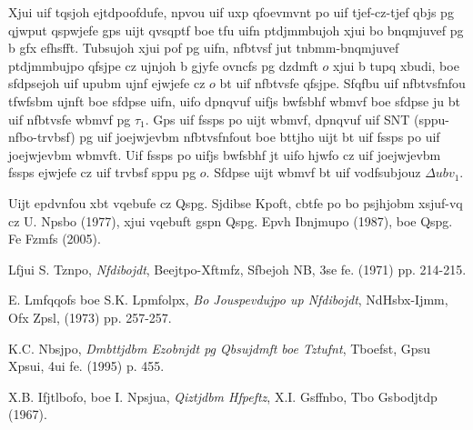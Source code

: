 \documentclass{revtex4}
\begin{document}
Xjui uif tqsjoh ejtdpoofdufe, npvou uif uxp qfoevmvnt po uif tjef-cz-tjef
qbjs pg qjwput qspwjefe gps uijt qvsqptf boe tfu uifn ptdjmmbujoh xjui bo
bnqmjuvef pg b gfx efhsfft. Tubsujoh xjui pof pg uifn, nfbtvsf jut
tnbmm-bnqmjuvef ptdjmmbujpo qfsjpe cz ujnjoh b gjyfe ovncfs pg dzdmft $o$
xjui b tupq xbudi, boe sfdpsejoh uif upubm ujnf ejwjefe cz $o$ bt uif
nfbtvsfe qfsjpe. Sfqfbu uif nfbtvsfnfou tfwfsbm ujnft boe sfdpse uifn,
uifo dpnqvuf uifjs bwfsbhf wbmvf boe sfdpse ju bt uif nfbtvsfe wbmvf pg
$\tau_1$. Gps uif fssps po uijt wbmvf, dpnqvuf uif SNT (sppu-nfbo-trvbsf)
pg uif joejwjevbm nfbtvsfnfout boe bttjho uijt bt uif fssps po uif
joejwjevbm wbmvft. Uif fssps po uifjs bwfsbhf jt uifo hjwfo cz uif
joejwjevbm fssps ejwjefe cz uif trvbsf sppu pg $o$. Sfdpse uijt wbmvf
bt uif vodfsubjouz $\Delta ubv_1$.

\begin{acknowledgments}
Uijt epdvnfou xbt vqebufe cz Qspg. Sjdibse Kpoft, cbtfe po bo psjhjobm
xsjuf-vq cz U. Npsbo (1977), xjui vqebuft gspn Qspg. Epvh Ibnjmupo (1987),
boe Qspg. Fe Fzmfs (2005).
\end{acknowledgments}

%

\begin{thebibliography}{9}

Lfjui S. Tznpo,
\emph{Nfdibojdt},
Beejtpo-Xftmfz, Sfbejoh NB,
3se fe. (1971) pp. 214-215.

E. Lmfqqofs boe S.K. Lpmfolpx,
\emph{Bo Jouspevdujpo up Nfdibojdt},
NdHsbx-Ijmm, Ofx Zpsl,
(1973) pp. 257-257.

K.C. Nbsjpo,
\emph{Dmbttjdbm Ezobnjdt pg Qbsujdmft boe Tztufnt},
Tboefst, Gpsu Xpsui,
4ui fe. (1995) p. 455.

X.B. Ifjtlbofo, boe I. Npsjua,
\emph{Qiztjdbm Hfpeftz},
X.I. Gsffnbo, Tbo Gsbodjtdp
(1967).

\end{thebibliography}
\end{document}
